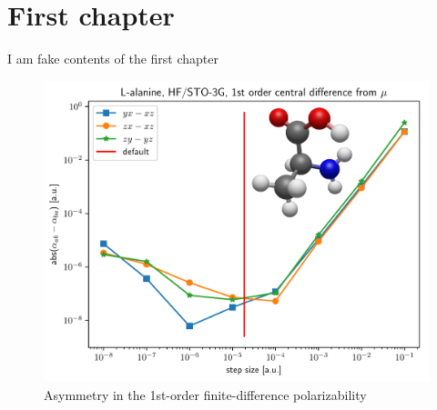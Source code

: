 \chapter{First chapter}
I am fake contents of the first chapter
\begin{figure}
  \centering
  \includegraphics[width=\textwidth]{./diff_overlay.pdf}
  \caption{Asymmetry in the 1st-order finite-difference polarizability\label{fig:finite-difference-numerical-noise}}
\end{figure}
